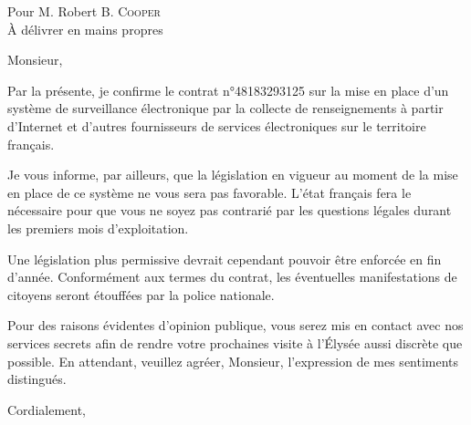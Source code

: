 \documentclass{letter}
\date{12 octobre 2015}
\begin{document}
%

\begin{letter}{Pour M. Robert B. \textsc{Cooper} \\
  À délivrer en mains propres}
  \opening{Monsieur,}

  Par la présente, je confirme le contrat n°48183293125 sur la mise en place
  d'un système de surveillance électronique par la collecte de renseignements à
  partir d'Internet et d'autres fournisseurs de services électroniques sur le
  territoire français.

  Je vous informe, par ailleurs, que la législation en vigueur au moment de la
  mise en place de ce système ne vous sera pas favorable. L'état français fera
  le nécessaire pour que vous ne soyez pas contrarié par les questions légales
  durant les premiers mois d'exploitation.

  Une législation plus permissive devrait cependant pouvoir être enforcée en fin
  d'année. Conformément aux termes du contrat, les éventuelles manifestations de
  citoyens seront étouffées par la police nationale.

  Pour des raisons évidentes d'opinion publique, vous serez mis en contact avec
  nos services secrets afin de rendre votre prochaines visite à l'Élysée aussi
  discrète que possible. En attendant, veuillez agréer, Monsieur, l'expression
  de mes sentiments distingués.

  \closing{Cordialement,}
\end{letter}
\end{document}
